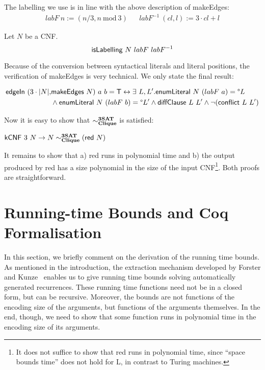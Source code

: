 \documentclass[a4paper,UKenglish,cleveref, autoref]{lipics-v2019}
\begin{document}
The labelling we use is in line with the above description of \textsf{makeEdges}:
\begin{align*}
  labF~n := (n/3, n~\text{mod}~3) && labF^{-1}~(cl, l) := 3 \cdot cl + l
\end{align*}
  
\begin{proposition}
  Let $N$ be a CNF. 
  \[\normalfont\textsf{isLabelling}~N~labF~labF^{-1} \]
\end{proposition}

Because of the conversion between syntactical literals and literal positions, the verification of \textsf{makeEdges} is very technical. We only state the final result:
\begin{lemma}
  \begin{align*}
    \normalfont\textsf{edgeIn}~(3\cdot |N|, &\normalfont\textsf{makeEdges}~N)~a~b = \mathsf{T} \leftrightarrow \exists~L,L'. \normalfont\textsf{enumLiteral}~N~(labF~a) = \degree L \\
    &\land \normalfont\textsf{enumLiteral}~N~(labF~b) = \degree L' \land \normalfont\textsf{diffClause}~L~L' \land \lnot(\normalfont\textsf{conflict}~L~L')
  \end{align*}
\end{lemma}

Now it is easy to show that $\sim^{\textbf{3SAT}}_{\textbf{Clique}}$ is satisfied:
\begin{corollary}\label{prop:redredrel}
  $\normalfont\textsf{kCNF}~3~N \rightarrow N \sim^{\textbf{3SAT}}_{\textbf{Clique}} (\normalfont\textsf{red}~N) $
\end{corollary}

It remains to show that a) \textsf{red} runs in polynomial time and b) the output produced by \textsf{red} has a size polynomial in the size of the input CNF\footnote{It does not suffice to show that \textsf{red} runs in polynomial time, since ``space bounds time'' does not hold for L, in contrast to Turing machines.}. Both proofs are straightforward.

\section{Running-time Bounds and Coq Formalisation}
In this section, we briefly comment on the derivation of the running time bounds. As mentioned in the introduction, the extraction mechanism developed by Forster and Kunze~\cite{ForsterKunze:2019:Certifying-extraction} enables us to give running time bounds solving automatically generated recurrences. These running time functions need not be in a closed form, but can be recursive. Moreover, the bounds are not functions of the encoding size of the arguments, but functions of the arguments themselves. 
In the end, though, we need to show that some function runs in polynomial time in the encoding size of its arguments. 
\end{document}
